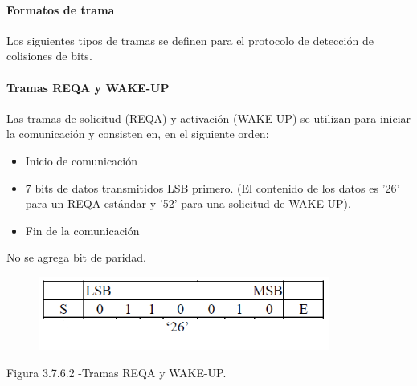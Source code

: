 \paragraph{Formatos de trama}
Los siguientes tipos de tramas se definen para el protocolo de detección de colisiones de bits.\par

\paragraph{Tramas REQA y WAKE-UP}
Las tramas de solicitud (REQA) y activación (WAKE-UP) se utilizan para iniciar la comunicación y consisten en, en el siguiente orden:\par

\begin{itemize}
	\item Inicio de comunicación\par

	\item 7 bits de datos transmitidos LSB primero. (El contenido de los datos es '26' para un REQA estándar y '52' para una solicitud de WAKE-UP).\par

	\item Fin de la comunicación
\end{itemize}\par

No se agrega bit de paridad.\par

\begin{figure}[H]
	\begin{center}
		\includegraphics[width=3.76in,height=0.95in]{Norma_ISO/14443-3/media/image6.png}
        \end{center}
\end{figure}

\par
\begin{center}
Figura 3.7.6.2 -Tramas REQA y WAKE-UP.
\end{center}
\par

